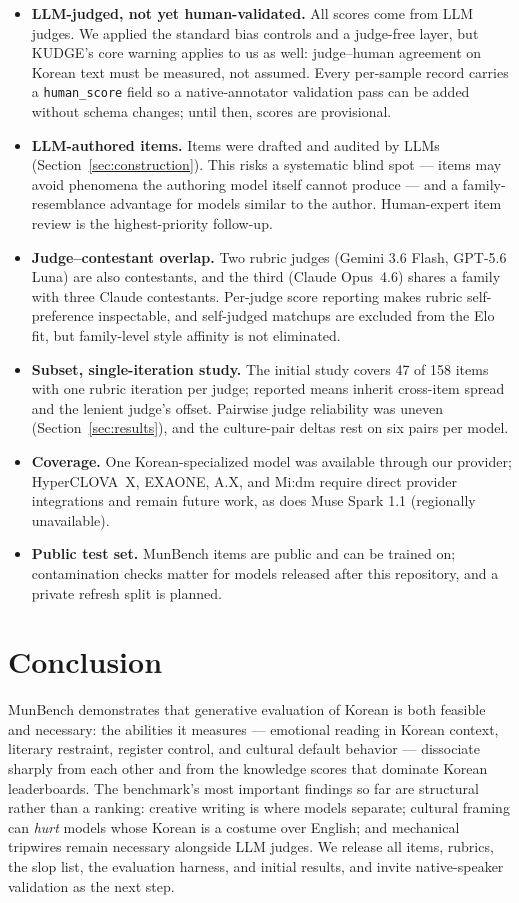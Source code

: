 \documentclass[11pt]{article}
\begin{document}
\begin{itemize}
\item \textbf{LLM-judged, not yet human-validated.} All scores come from
LLM judges. We applied the standard bias controls and a judge-free layer,
but KUDGE's core warning applies to us as well: judge--human agreement on
Korean text must be measured, not assumed. Every per-sample record
carries a \texttt{human\_score} field so a native-annotator validation
pass can be added without schema changes; until then, scores are
provisional.
\item \textbf{LLM-authored items.} Items were drafted and audited by
LLMs (Section~\ref{sec:construction}). This risks a systematic blind
spot --- items may avoid phenomena the authoring model itself cannot
produce --- and a family-resemblance advantage for models similar to the
author. Human-expert item review is the highest-priority follow-up.
\item \textbf{Judge--contestant overlap.} Two rubric judges (Gemini 3.6
Flash, GPT-5.6 Luna) are also contestants, and the third (Claude
Opus~4.6) shares a family with three Claude contestants. Per-judge score
reporting makes rubric self-preference inspectable, and self-judged
matchups are excluded from the Elo fit, but family-level style affinity
is not eliminated.
\item \textbf{Subset, single-iteration study.} The initial study covers
47 of 158 items with one rubric iteration per judge; reported means
inherit cross-item spread and the lenient judge's offset. Pairwise judge
reliability was uneven (Section~\ref{sec:results}), and the culture-pair
deltas rest on six pairs per model.
\item \textbf{Coverage.} One Korean-specialized model was available
through our provider; HyperCLOVA~X, EXAONE, A.X, and Mi:dm require direct
provider integrations and remain future work, as does Muse Spark 1.1
(regionally unavailable).
\item \textbf{Public test set.} MunBench items are public and can be
trained on; contamination checks matter for models released after this
repository, and a private refresh split is planned.
\end{itemize}

\section{Conclusion}

MunBench demonstrates that generative evaluation of Korean is both
feasible and necessary: the abilities it measures --- emotional reading in
Korean context, literary restraint, register control, and cultural
default behavior --- dissociate sharply from each other and from the
knowledge scores that dominate Korean leaderboards. The benchmark's most
important findings so far are structural rather than a ranking: creative
writing is where models separate; cultural framing can \emph{hurt} models
whose Korean is a costume over English; and mechanical tripwires remain
necessary alongside LLM judges. We release all items, rubrics, the slop
list, the evaluation harness, and initial results, and invite
native-speaker validation as the next step.
\end{document}
